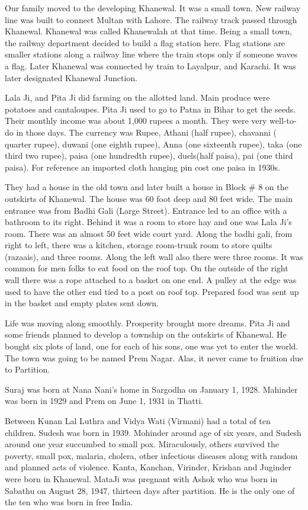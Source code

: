 Our family moved to the developing Khanewal. 
It was a small town. New railway line was built to connect Multan with Lahore. The railway track passed through Khanewal. Khanewal was called Khanewalah at that time. Being a small town, the railway department decided to build a flag station here. Flag stations are smaller stations along a railway line where the train stops only if someone waves a flag. Later Khanewal was connected by train to Layalpur, and Karachi. It was later designated Khanewal Junction. 

Lala Ji, and Pita Ji did farming on the allotted land. Main produce were potatoes and cantaloupes. Pita Ji used to go to Patna in Bihar to get the seeds. Their monthly income was about 1,000 rupees a month. They were very well-to-do in those days. The currency was Rupee, Athani (half rupee), chavanni ( quarter rupee), duwani (one eighth rupee), Anna (one sixteenth rupee), taka (one third two rupee), paisa (one hundredth rupee), duels(half paisa), pai (one third paisa). For reference an imported cloth hanging pin cost one paisa in 1930s. 

They had a house in the old town and later built a house in Block # 8 on the outskirts of Khanewal. The house was 60 foot deep and 80 feet wide. The main entrance was from Badhi Gali (Large Street). Entrance led to an office with a bathroom to its right. Behind it was a room to store hay and one was Lala Ji’s room. There was an almost 50 feet wide court yard. Along the badhi gali, from right to left, there was a kitchen, storage room-trunk room to store quilts (razaais), and three rooms. Along the left wall also there were three rooms. It was common for men folks to eat food on the roof top. 
On the outside of the right wall there was a rope attached to a basket on one end. A pulley at the edge was used to have the other end tied to a post on roof top. Prepared food was sent up in the basket and empty plates sent down. 


Life was moving along smoothly. Prosperity brought more dreams. Pita Ji and some friends planned to develop a township on the outskirts of Khanewal. He bought six plots of land, one for each of his sons, one was yet to enter the world. The town was going to be named Prem Nagar. Alas, it never came to fruition due to Partition. 

Suraj was born at Nana Nani’s home in Sargodha on January 1, 1928. Mahinder was born in 1929 and Prem on June 1, 1931 in Thatti. 

Between Kunan Lal Luthra and Vidya Wati (Virmani) had a total of ten children. Sudesh was born in 1939. Mohinder around age of six years, and Sudesh around one year succumbed to small pox. Miraculously, others survived the poverty, small pox, malaria, cholera, other  infectious diseases along with random and planned acts of violence. Kanta, Kanchan, Virinder, Krishan and Juginder were born in Khanewal. MataJi was pregnant with Ashok who was born in Sabathu on August 28, 1947, thirteen days after partition. He is the only one of the ten who was born in free India. 

